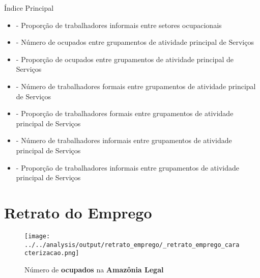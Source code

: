 \documentclass[11pt]{beamer}
\begin{document}
\begin{frame}[label=indice_principal]{Índice Principal}
\begin{tiny}
\begin{itemize}
\item{
	\hyperlink{_retrato_emprego_pie_n_de_informal_gstr}{} - {\tiny Proporção de trabalhadores informais entre setores ocupacionais}
	}  	
	
\item{
	\hyperlink{_retrato_emprego_bar_n_de_ocupado_gstr}{} - {\tiny Número de ocupados entre grupamentos de atividade principal de Serviços}
	}  
		
		
\item{
	\hyperlink{_retrato_emprego_pie_n_de_ocupado_gape}{} - {\tiny Proporção de ocupados entre grupamentos de atividade principal de Serviços}
	}  
		
\item{
	\hyperlink{_retrato_emprego_bar_n_de_formal_gape}{} - {\tiny Número de trabalhadores formais entre grupamentos de atividade principal de Serviços}
	}  
		
		
\item{
	\hyperlink{_retrato_emprego_pie_n_de_formal_gape}{} - {\tiny Proporção de trabalhadores formais entre grupamentos de atividade principal de Serviços}
	}  
			

\item{
	\hyperlink{_retrato_emprego_bar_n_de_informal_gape}{} - {\tiny Número de trabalhadores informais entre grupamentos de atividade principal de Serviços}
	}  
		
\item{
	\hyperlink{_retrato_emprego_pie_n_de_informal_gape}{} - {\tiny Proporção de trabalhadores informais entre grupamentos de atividade principal de Serviços}
	}		
\end{itemize}
\end{tiny}
\end{frame}

\section{Retrato do Emprego}


\begin{frame}[label=_retrato_emprego_caracterizacao]{}
\textit{\hyperlink{indice_principal}{}}
\begin{figure}
  \centering
  \texttt{[image: ../../analysis/output/retrato\_emprego/\_retrato\_emprego\_caracterizacao.png]}
  \label{fig:_retrato_emprego_caracterizacao}
  \caption{{\tiny Número de \textbf{ocupados} na \textbf{Amazônia Legal}}}
\end{figure}
\end{frame}
\end{document}
